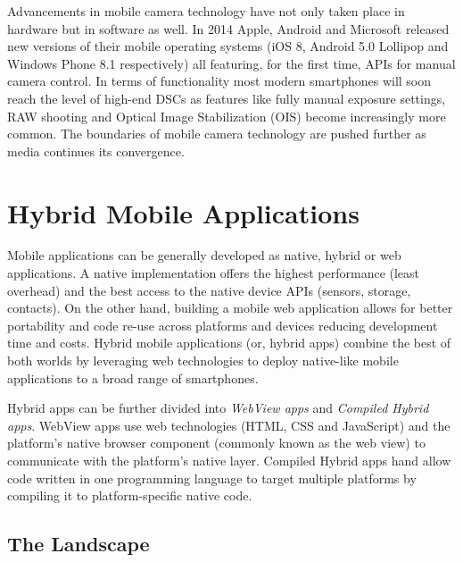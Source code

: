 \documentclass[thesis.tex]{subfiles}
\begin{document}
Advancements in mobile camera technology have not only taken place in hardware but in software as well. In 2014 Apple, Android and Microsoft released new versions of their mobile operating systems (iOS 8, Android 5.0 Lollipop and Windows Phone 8.1 respectively) all featuring, for the first time, APIs for manual camera control. In terms of functionality most modern smartphones will soon reach the level of high-end DSCs as features like fully manual exposure settings, RAW shooting and Optical Image Stabilization (OIS) become increasingly more common. The boundaries of mobile camera technology are pushed further as media continues its convergence.

\section{Hybrid Mobile Applications}
\label{section:hybrid_mobile_landscape}

Mobile applications can be generally developed as native, hybrid or web applications. A native implementation offers the highest performance (least overhead) and the best access to the native device APIs (sensors, storage, contacts). On the other hand, building a mobile web application allows for better portability and code re-use across platforms and devices reducing development time and costs. Hybrid mobile applications (or, hybrid apps) combine the best of both worlds by leveraging web technologies to deploy native-like mobile applications to a broad range of smartphones.

Hybrid apps can be further divided into \textit{WebView apps} and \textit{Compiled Hybrid apps}. WebView apps use web technologies (HTML, CSS and JavaScript) and the platform's native browser component (commonly known as the web view) to communicate with the platform's native layer. Compiled Hybrid apps hand allow code written in one programming language to target multiple platforms by compiling it to platform-specific native code.

\subsection{The Landscape}
\end{document}
